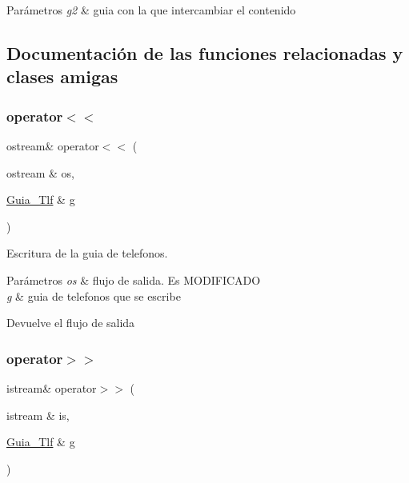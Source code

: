 \begin{DoxyParams}{Parámetros}
{\em g2} & guia con la que intercambiar el contenido \\
\hline
\end{DoxyParams}


\subsection{Documentación de las funciones relacionadas y clases amigas}
\mbox{\label{classGuia__Tlf_a73eb02557f3118999710c66aa9ecf309}} 
\subsubsection{\texorpdfstring{operator$<$$<$}{operator<<}}
{\footnotesize\ttfamily ostream\& operator$<$$<$ (\begin{DoxyParamCaption}\item[{ostream \&}]{os,  }\item[{\hyperlink{classGuia__Tlf}{Guia\+\_\+\+Tlf} \&}]{g }\end{DoxyParamCaption})\hspace{0.3cm}{\ttfamily [friend]}}



Escritura de la guia de telefonos. 


\begin{DoxyParams}{Parámetros}
{\em os} & flujo de salida. Es M\+O\+D\+I\+F\+I\+C\+A\+DO \\
\hline
{\em g} & guia de telefonos que se escribe \\
\hline
\end{DoxyParams}
\begin{DoxyReturn}{Devuelve}
el flujo de salida 
\end{DoxyReturn}
\mbox{\label{classGuia__Tlf_ac15a5b0c2eb7d5b1843f11beb492495e}} 
\subsubsection{\texorpdfstring{operator$>$$>$}{operator>>}}
{\footnotesize\ttfamily istream\& operator$>$$>$ (\begin{DoxyParamCaption}\item[{istream \&}]{is,  }\item[{\hyperlink{classGuia__Tlf}{Guia\+\_\+\+Tlf} \&}]{g }\end{DoxyParamCaption})\hspace{0.3cm}{\ttfamily [friend]}}



